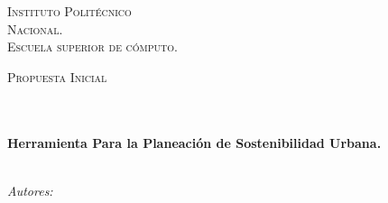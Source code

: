 \documentclass[10pt]{article}
\begin{document}
\begin{center}
\vspace*{-1.5cm}                                %
\textsc{\huge Instituto Polit\'ecnico\\ \vspace{5px} Nacional.}\\[1.5cm] 

\textsc{\LARGE Escuela superior de c\'omputo.}\\[1.5cm]                                                   %

\begin{minipage}{0.9\textwidth} 
\begin{center}                                                                                  %
\textsc{\LARGE Propuesta Inicial}
\end{center}
\end{minipage}\\[0.5cm]
            \vspace*{1cm}                                                                       %
\HRule \\[0.4cm]                                                                    %
{ \huge \bfseries Herramienta Para la Planeación de Sostenibilidad Urbana.}\\[0.4cm]  %
\HRule \\[1.5cm]                                                                    %
\begin{minipage}{0.46\textwidth}                                                    %
\begin{flushleft} \large                                                            %
\emph{Autores:}\\ 


\end{flushleft}
\end{minipage}
\end{center}
\end{document}
